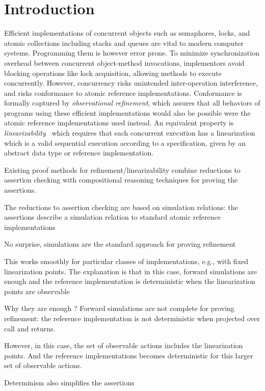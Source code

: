 \section{Introduction}

Efficient implementations of concurrent objects such as semaphores, locks, and atomic collections including stacks and queues are vital to modern computer systems. Programming them is however error prone. To minimize synchronization overhead between concurrent object-method invocations, implementors avoid blocking operations like lock acquisition, allowing methods to execute concurrently. However, concurrency risks unintended inter-operation interference, and risks conformance to atomic reference implementations. Conformance is formally captured by \emph{observational refinement}, which assures that all behaviors of programs
using these efficient implementations would also be possible were the atomic
reference implementations used instead.
An equivalent property is \emph{linearizability}~\cite{journals/toplas/HerlihyW90} which requires that each concurrent execution
has a linearization which is a valid sequential execution according to a
specification, given by an abstract data type or reference implementation.

Existing proof methods for refinement/linearizability combine reductions to assertion checking with compositional reasoning techniques for proving the assertions.

The reductions to assertion checking are based on simulation relations: the assertions describe a simulation relation to standard atomic reference implementations

No surprise, simulations are the standard approach for proving refinement

This works smoothly for particular classes of implementations, e.g., with fixed linearization points. The explanation is that in this case, forward simulations are enough and the reference implementation is deterministic when the linearization points are observable

Why they are enough ? Forward simulations are not complete for proving refinement: the reference implementation is not deterministic when projected over call and returns. 

However, in this case, the set of observable actions includes the linearization points. And the reference implementations becomes deterministic for this larger set of observable actions.

Determinism also simplifies the assertions

